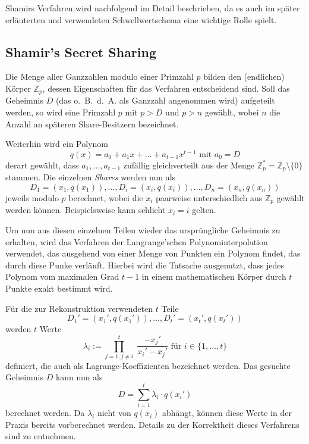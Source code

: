 Shamirs Verfahren wird nachfolgend im Detail beschrieben, da es auch im später erläuterten und verwendeten Schwellwertschema eine wichtige Rolle spielt.

\subsection{Shamir's Secret Sharing}

\label{sec_basics_threshold_shamir}

Die Menge aller Ganzzahlen modulo einer Primzahl \(p\) bilden den (endlichen) Körper \(\mathbb{Z}_p\), dessen Eigenschaften für das Verfahren entscheidend sind. Soll das Geheimnis \(D\) (das o.~B.~d.~A. als Ganzzahl angenommen wird) aufgeteilt werden, so wird eine Primzahl \(p\) mit \(p > D\) und \(p > n\) gewählt, wobei \(n\) die Anzahl an späteren Share-Besitzern bezeichnet. 

Weiterhin wird ein Polynom 
\[q(x) = a_0 + a_1x + \dots + a_{t-1}x^{t-1} \text{ mit } a_0 = D\] 
derart gewählt, dass \(a_1, \dots, a_{t-1}\) zufällig gleichverteilt aus der Menge \(\mathbb{Z}_p^* = \mathbb{Z}_p \setminus \{0\}\) stammen. Die einzelnen \textit{Shares} werden nun als
\[D_1=(x_1,q(x_1)), \dots, D_i=(x_i,q(x_i)), \dots, D_n=(x_n,q(x_n))\]
jeweils modulo \(p\) berechnet, wobei die \(x_i\) paarweise unterschiedlich aus \(\mathbb{Z}_p\) gewählt werden können. Beispielsweise kann schlicht \(x_i = i\) gelten.%

Um nun aus diesen einzelnen Teilen wieder das ursprüngliche Geheimnis zu erhalten, wird das Verfahren der Langrange'schen Polynominterpolation verwendet, das ausgehend von einer Menge von Punkten ein Polynom findet, das durch diese Punke verläuft. Hierbei wird die Tatsache ausgenutzt, dass jedes Polynom vom maximalen Grad \(t-1\) in einem mathematischen Körper durch \(t\) Punkte exakt bestimmt wird.

Für die zur Rekonstruktion verwendeten \(t\) Teile 
\[D_1'=(x_1',q(x_1')),\dots,D_t'=(x_t',q(x_t'))\] 
werden \(t\) Werte %
\[\lambda_i := \prod_{j=1, j \not= i}^{t} \; \frac{- x_j'}{x_i' - x_j'} \text{ für } i \in \{1,\dots,t\}\] 
definiert, die auch als Lagrange-Koeffizienten bezeichnet werden. Das gesuchte Geheimnis \(D\) kann nun als
\[D = \sum_{i=1}^{t}\lambda_i \cdot q(x_i')\]
berechnet werden. Da \(\lambda_i\) nicht von \(q(x_i)\) abhängt, können diese Werte in der Praxis bereits vorberechnet werden. Details zu der Korrektheit dieses Verfahrens sind \cite{boneh2016} zu entnehmen.

